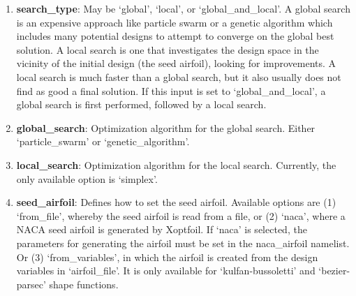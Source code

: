 \documentclass[11pt]{article}
\begin{document}
\begin{enumerate}
\item{\textbf{search\_type}: May be `global', `local', or `global\_and\_local'.
A global search is an expensive approach like particle swarm or a genetic algorithm which
includes many potential designs to attempt to converge on the global best solution.  A
local search is one that investigates the design space in the vicinity of the initial
design (the seed airfoil), looking for improvements.  A local search is much faster than
a global search, but it also usually does not find as good a final solution.  If this
input is set to `global\_and\_local', a global search is first performed, followed by a
local search.}
\item{\textbf{global\_search}: Optimization algorithm for the global search.  Either
`particle\_swarm' or `genetic\_algorithm'.}
\item{\textbf{local\_search}: Optimization algorithm for the local search.  Currently, the
only available option is `simplex'.}
\item{\textbf{seed\_airfoil}: Defines how to set the seed airfoil.  Available options are
(1) `from\_file', whereby the seed airfoil is read from a file, or (2) `naca', where a
NACA seed airfoil is generated by Xoptfoil. If `naca' is selected, the parameters for
generating the airfoil must be set in the naca\_airfoil namelist. Or (3) `from\_variables',
in which the airfoil is created from the design variables in `airfoil\_file'. It is only available
for `kulfan-bussoletti' and `bezier-parsec' shape functions.}


\end{enumerate}
\end{document}
